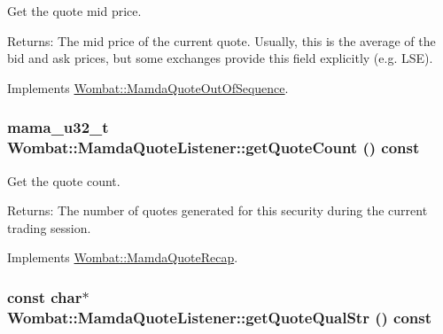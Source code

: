 Get the quote mid price. 

\begin{Desc}
\item[Returns:]The mid price of the current quote. Usually, this is the average of the bid and ask prices, but some exchanges provide this field explicitly (e.g. LSE). \end{Desc}


Implements \hyperlink{classWombat_1_1MamdaQuoteOutOfSequence_fa1e82ccf6a101f0581a557399ea9adc}{Wombat::Mamda\-Quote\-Out\-Of\-Sequence}.\hypertarget{classWombat_1_1MamdaQuoteListener_85066bf1980233f52a8db81584537edf}{
\subsubsection[getQuoteCount]{\setlength{\rightskip}{0pt plus 5cm}mama\_\-u32\_\-t Wombat::Mamda\-Quote\-Listener::get\-Quote\-Count () const}}
\label{classWombat_1_1MamdaQuoteListener_85066bf1980233f52a8db81584537edf}


Get the quote count. 

\begin{Desc}
\item[Returns:]The number of quotes generated for this security during the current trading session. \end{Desc}


Implements \hyperlink{classWombat_1_1MamdaQuoteRecap_538b0e423e2ecf6b4be494bfc07186eb}{Wombat::Mamda\-Quote\-Recap}.\hypertarget{classWombat_1_1MamdaQuoteListener_e33ca4e1fa76fb882185676c0d865be7}{
\subsubsection[getQuoteQualStr]{\setlength{\rightskip}{0pt plus 5cm}const char$\ast$ Wombat::Mamda\-Quote\-Listener::get\-Quote\-Qual\-Str () const}}
\label{classWombat_1_1MamdaQuoteListener_e33ca4e1fa76fb882185676c0d865be7}


